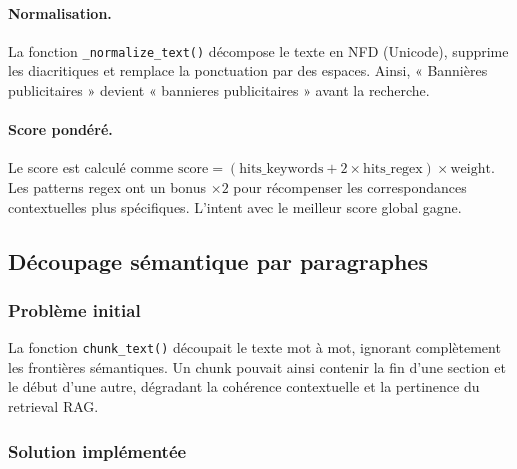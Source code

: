 \documentclass[12pt,a4paper]{report}
\begin{document}
\paragraph{Normalisation.} La fonction \texttt{\_normalize\_text()} décompose le texte
en NFD (Unicode), supprime les diacritiques et remplace la ponctuation par des espaces.
Ainsi, « Bannières publicitaires » devient « bannieres publicitaires » avant la recherche.

\paragraph{Score pondéré.} Le score est calculé comme
\(\text{score} = (\text{hits\_keywords} + 2 \times \text{hits\_regex}) \times \text{weight}\).
Les patterns regex ont un bonus $\times 2$ pour récompenser les correspondances
contextuelles plus spécifiques. L'intent avec le meilleur score global gagne.

\subsection{Découpage sémantique par paragraphes}

\subsubsection{Problème initial}

La fonction \texttt{chunk\_text()} découpait le texte mot à mot, ignorant complètement
les frontières sémantiques. Un chunk pouvait ainsi contenir la fin d'une section et le
début d'une autre, dégradant la cohérence contextuelle et la pertinence du retrieval RAG.

\subsubsection{Solution implémentée}
\end{document}
